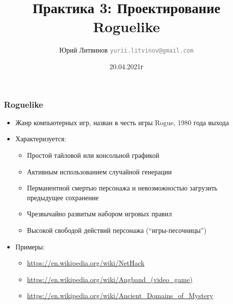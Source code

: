 \documentclass[xetex,mathserif,serif]{beamer}
\title{Практика 3: Проектирование Roguelike}
\author[Юрий Литвинов]{Юрий Литвинов \newline \textcolor{gray}{\small\texttt{yurii.litvinov@gmail.com}}}
\date{20.04.2021г}
\begin{document}
    \maketitle

    \begin{frame}
        \frametitle{Roguelike}
        \begin{itemize}
            \item Жанр компьютерных игр, назван в честь игры Rogue, 1980 года выхода
            \item Характеризуется:
            \begin{itemize}
                \item Простой тайловой или консольной графикой
                \item Активным использованием случайной генерации
                \item Перманентной смертью персонажа и невозможностью загрузить предыдущее сохранение
                \item Чрезвычайно развитым набором игровых правил
                \item Высокой свободой действий персонажа (``игры-песочницы'')
            \end{itemize}
            \item Примеры:
            \begin{itemize}
                \item \url{https://en.wikipedia.org/wiki/NetHack}
                \item \url{https://en.wikipedia.org/wiki/Angband_(video_game)}
                \item \url{https://en.wikipedia.org/wiki/Ancient_Domains_of_Mystery}
            \end{itemize}
        \end{itemize}
    \end{frame}
\end{document}
